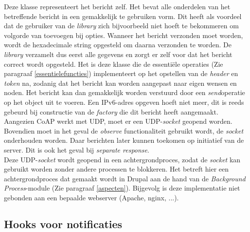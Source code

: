 Deze klasse representeert het bericht zelf. Het bevat alle onderdelen van het betreffende bericht in een gemakkelijk te gebruiken vorm. Dit heeft als voordeel dat de gebruiker van de \textit{library} zich bijvoorbeeld niet hoeft te bekommeren om volgorde van toevoegen bij opties. Wanneer het bericht verzonden moet worden, wordt de hexadecimale string opgesteld om daarna verzonden te worden. De \textit{library} verzamelt dus eerst alle gegevens en zorgt er zelf voor dat het bericht correct wordt opgesteld. Het is deze klasse die de essenti\"{e}le operaties (Zie paragraaf \ref{essentielefuncties}) implementeert op het opstellen van de \textit{header} en \textit{token} na, zodanig dat het bericht kan worden aangepast naar eigen wensen en noden. Het bericht kan dan gemakkelijk worden verstuurd door een \textit{send}operatie op het object uit te voeren. Een IPv6-adres opgeven hoeft niet meer, dit is reeds gebeurd bij constructie van de \textit{factory} die dit bericht heeft aangemaakt. Aangezien CoAP werkt met UDP, moet er een UDP-\textit{socket} geopend worden. Bovendien moet in het geval de \textit{observe} functionaliteit gebruikt wordt, de \textit{socket} onderhouden worden. Daar berichten later kunnen toekomen op initiatief van de server. Dit is ook het geval bij \textit{separate response}.\\
Deze UDP-\textit{socket} wordt geopend in een achtergrondproces, zodat de \textit{socket} kan gebruikt worden zonder andere processen te blokkeren. Het betreft hier een achtergrondproces dat gemaakt wordt in Drupal aan de hand van de \textit{Background Process}-module \cite{backgroundProcessModule} (Zie paragraaf \ref{aspecten}). Bijgevolg is deze implementatie niet gebonden aan een bepaalde webserver (Apache, nginx, ...).

\subsection{Hooks voor notificaties} \label{observe_hooks}

